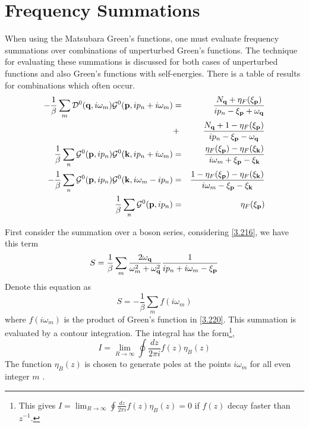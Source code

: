 \section{Frequency Summations}\label{s3.5}
When using the Matsubara Green's functions, one must evaluate frequency summations over combinations of unperturbed Green's functions.
The technique for evaluating these summations is discussed for both cases of unperturbed functions and also Green's functions with self-energies.
There is a table of results for combinations which often occur.
\begin{eqnarray}
  -\frac{1}{\beta} \sum_m \mathcal{D}^0(\mathbf{q},i\omega_m)\mathcal{G}^0(\mathbf{p},ip_n+i\omega_m) &=& \frac{N_{\mathbf{q}} + \eta_F(\xi_{\mathbf{p}})}{ip_n-\xi_{\mathbf{p}}+\omega_{\mathbf{q}}} \nonumber \\
  &+& \frac{N_{\mathbf{q}} + 1 - \eta_F(\xi_{\mathbf{p}})}{ip_n -\xi_{\mathbf{p}}-\omega_{\mathbf{q}}} \label{3.216} \\
  \frac{1}{\beta} \sum_n \mathcal{G}^0(\mathbf{p},ip_n) \mathcal{G}^0(\mathbf{k},ip_n+i\omega_m) &=& \frac{\eta_F(\xi_{\mathbf{p}})-\eta_F(\xi_{\mathbf{k}})}{i\omega_m + \xi_{\mathbf{p}} -\xi_{\mathbf{k}}} \label{3.217} \\
  -\frac{1}{\beta} \sum_n \mathcal{G}^0(\mathbf{p},ip_n) \mathcal{G}^0(\mathbf{k},i\omega_m-ip_n) &=& \frac{1-\eta_F(\xi_{\mathbf{p}}) - \eta_F(\xi_{\mathbf{k}})}{i\omega_m -\xi_{\mathbf{p}} -\xi_{\mathbf{k}}} \label{3.218}\\
  \frac{1}{\beta} \sum_n \mathcal{G}^0(\mathbf{p},ip_n) &=& \eta_F(\xi_{\mathbf{p}})\label{3.219}
\end{eqnarray}

First consider the summation over a boson series, considering \eqref{3.216}, we have this term
\begin{equation}
  S = \frac{1}{\beta} \sum_m \frac{2\omega_{\mathbf{q}}}{\omega_m^2+\omega_{\mathbf{q}}^2} \frac{1}{ip_n+i\omega_m -\xi_{\mathbf{p}}} \label{3.220}
\end{equation}
Denote this equation as
\begin{equation}
  S = -\frac{1}{\beta} \sum_m f(i\omega_m) \label{3.221}
\end{equation}
where $f(i\omega_m)$ is the product of Green's function in \eqref{3.220}. This summation is evaluated by a contour integration. The integral has the form\footnote{This gives $I = \lim_{R\to \infty} \oint \frac{dz}{2\pi i} f(z) \eta_B(z) =0$  if $f(z)$ decay faster than $z^{-1}$.
},
\begin{equation}
  I = \lim_{R\to \infty} \oint \frac{dz}{2\pi i} f(z) \eta_B(z)  \label{3.222}
\end{equation}
The function $\eta_B(z)$ is chosen to generate poles at the points $i\omega_m$ for all even integer $m$ .

